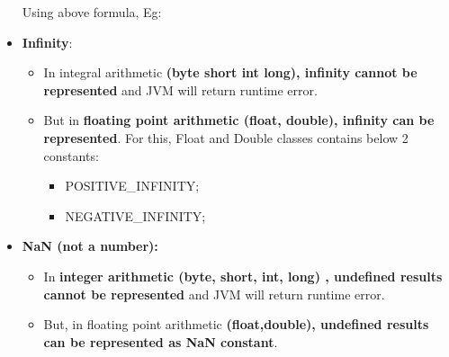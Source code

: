 \begin{flushleft}
\begin{itemize}
		Using above formula,
		\newpage
		Eg:
	
		\bigskip
		
		\item \textbf{Infinity}: 
		\begin{itemize}
			\item In integral arithmetic \textbf{(byte short int long)}\textbf{, infinity cannot be represented} and JVM will return runtime error.
			\bigskip
			
			\item But in \textbf{floating point arithmetic (float, double), infinity can be represented}.  For this, Float and Double classes contains below 2 constants:
			\begin{itemize}
				\item POSITIVE\_INFINITY;
				\item NEGATIVE\_INFINITY;
			\end{itemize}
			\bigskip		
		\end{itemize}
		
		\bigskip
		\item \textbf{NaN (not a number):}
		\begin{itemize}
			\item In \textbf{integer arithmetic (byte, short, int, long) , undefined results cannot be represented} and JVM will return runtime error.
			\bigskip
		
			\item But, in floating point arithmetic \textbf{(float,double), undefined results can be represented as NaN constant}.
			\bigskip
				
		\end{itemize} 
		
	\end{itemize}
	
\end{flushleft}








